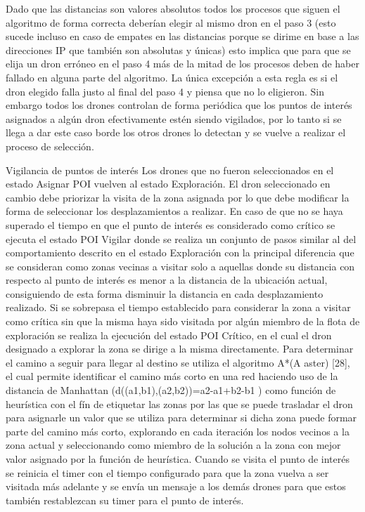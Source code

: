 Dado que las distancias son valores absolutos todos los procesos que siguen el algoritmo de forma correcta deberían elegir al mismo dron en el paso 3 (esto sucede incluso en caso de empates en las distancias porque se dirime en base a las direcciones IP que también son absolutas y únicas) esto implica que para que se elija un dron erróneo en el paso 4 más de la mitad de los procesos deben de haber fallado en alguna parte del algoritmo. La única excepción a esta regla es si el dron elegido falla justo al final del paso 4 y piensa que no lo eligieron. Sin embargo todos los drones controlan de forma periódica que los puntos de interés asignados a algún dron efectivamente estén siendo vigilados, por lo tanto si se llega a dar este caso borde los otros drones lo detectan y se vuelve a realizar el proceso de selección.

Vigilancia de puntos de interés
Los drones que no fueron seleccionados en el estado Asignar POI vuelven al estado  Exploración. El dron seleccionado en cambio debe priorizar la visita de la zona asignada por lo que debe modificar la forma de seleccionar los desplazamientos a realizar. En caso de que no se haya superado el tiempo en que el punto de interés es considerado como crítico se ejecuta el estado POI Vigilar donde se realiza un conjunto de pasos similar al del comportamiento descrito en el estado Exploración con la principal diferencia que se consideran como zonas vecinas a visitar solo a aquellas donde su distancia con respecto al punto de interés es menor a la distancia de la ubicación actual, consiguiendo de esta forma disminuir la distancia en cada desplazamiento realizado.
Si se sobrepasa el tiempo establecido para considerar la zona a visitar como crítica sin que la misma haya sido visitada por algún miembro de la flota de exploración se realiza la ejecución del estado POI Crítico, en el cual el dron designado a explorar la zona se dirige a la misma directamente. Para determinar el camino a seguir para llegar al destino se utiliza el algoritmo A*(A aster) [28], el cual permite identificar el camino más corto en una red haciendo uso de la distancia de 
Manhattan (d((a1,b1),(a2,b2))=a2-a1+b2-b1 ) como función de heurística con el fín de etiquetar las zonas por las que se puede trasladar el dron para asignarle un valor que se utiliza para determinar si dicha zona puede formar parte del camino más corto, explorando en cada iteración los nodos vecinos a la zona actual y seleccionando como miembro de la solución a la zona con mejor valor asignado por la función de heurística.
Cuando se visita el punto de interés se reinicia el timer con el tiempo configurado para que la zona vuelva a ser visitada más adelante y se envía un mensaje a los demás drones para que estos también restablezcan su timer para el punto de interés.



